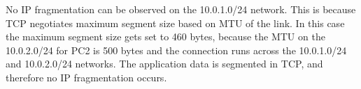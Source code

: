 No IP fragmentation can be observed on the 10.0.1.0/24 network. This is because TCP negotiates maximum segment size based on MTU of the link. In this case the maximum segment size gets set to 460 bytes, because the MTU on the 10.0.2.0/24 for PC2 is 500 bytes and the connection runs across the 10.0.1.0/24 and 10.0.2.0/24 networks. The application data is segmented in TCP, and therefore no IP fragmentation occurs.
